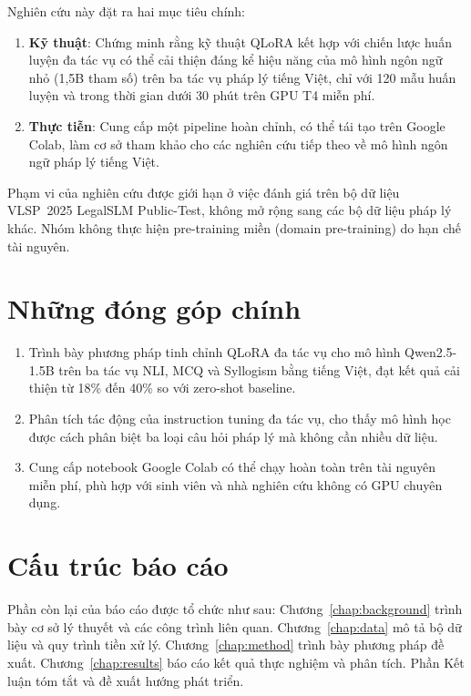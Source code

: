 \documentclass[fontsize=13pt,a4paper,oneside,DIV=calc,chapterprefix=true]{scrbook}
\begin{document}
Nghiên cứu này đặt ra hai mục tiêu chính:
\begin{enumerate}
  \item \textbf{Kỹ thuật}: Chứng minh rằng kỹ thuật QLoRA kết hợp với chiến lược huấn luyện
    đa tác vụ có thể cải thiện đáng kể hiệu năng của mô hình ngôn ngữ nhỏ (1,5B tham số) trên
    ba tác vụ pháp lý tiếng Việt, chỉ với 120 mẫu huấn luyện và trong thời gian dưới 30 phút
    trên GPU T4 miễn phí.
  \item \textbf{Thực tiễn}: Cung cấp một pipeline hoàn chỉnh, có thể tái tạo trên Google Colab,
    làm cơ sở tham khảo cho các nghiên cứu tiếp theo về mô hình ngôn ngữ pháp lý tiếng Việt.
\end{enumerate}

Phạm vi của nghiên cứu được giới hạn ở việc đánh giá trên bộ dữ liệu VLSP~2025 LegalSLM
Public-Test, không mở rộng sang các bộ dữ liệu pháp lý khác. Nhóm không thực hiện pre-training
miền (domain pre-training) do hạn chế tài nguyên.

\section*{Những đóng góp chính}

\begin{enumerate}
  \item Trình bày phương pháp tinh chỉnh QLoRA đa tác vụ cho mô hình Qwen2.5-1.5B trên ba tác
    vụ NLI, MCQ và Syllogism bằng tiếng Việt, đạt kết quả cải thiện từ 18\% đến 40\% so với
    zero-shot baseline.
  \item Phân tích tác động của instruction tuning đa tác vụ, cho thấy mô hình học được cách
    phân biệt ba loại câu hỏi pháp lý mà không cần nhiều dữ liệu.
  \item Cung cấp notebook Google Colab có thể chạy hoàn toàn trên tài nguyên miễn phí, phù hợp
    với sinh viên và nhà nghiên cứu không có GPU chuyên dụng.
\end{enumerate}

\section*{Cấu trúc báo cáo}

Phần còn lại của báo cáo được tổ chức như sau: Chương~\ref{chap:background} trình bày cơ sở
lý thuyết và các công trình liên quan. Chương~\ref{chap:data} mô tả bộ dữ liệu và quy trình
tiền xử lý. Chương~\ref{chap:method} trình bày phương pháp đề xuất. Chương~\ref{chap:results}
báo cáo kết quả thực nghiệm và phân tích. Phần Kết luận tóm tắt và đề xuất hướng phát triển.
\end{document}
